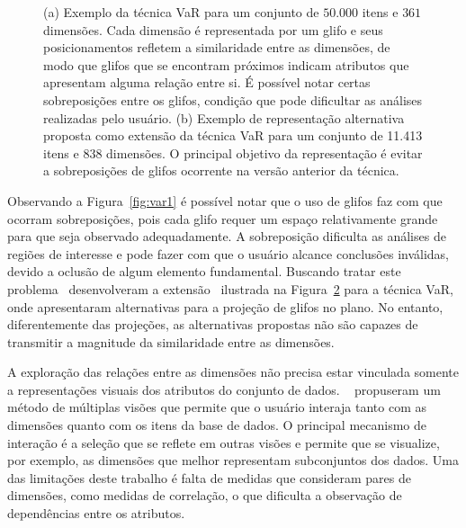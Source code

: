 \begin{figure}[h!]
\begin{subfigure}[b]{0.475\textwidth}
    \caption{}
    \label{fig:var2}
  \end{subfigure}
  \caption[VaR: Value and Relation]{(a) Exemplo da técnica VaR para um conjunto de $50.000$ itens e $361$ dimensões. Cada dimensão é representada por um glifo e seus posicionamentos refletem a similaridade entre as dimensões, de modo que glifos que se encontram próximos indicam atributos que apresentam alguma relação entre si. É possível notar certas sobreposições entre os glifos, condição que pode dificultar as análises realizadas pelo usuário. (b) Exemplo de representação alternativa proposta como extensão da técnica VaR para um conjunto de 11.413 itens e 838 dimensões. O principal objetivo da representação é evitar a sobreposições de glifos ocorrente na versão anterior da técnica.}
\end{figure}

Observando a Figura~\ref{fig:var1} é possível notar que o uso de glifos faz com que ocorram sobreposições, pois cada glifo requer um espaço relativamente grande para que seja observado adequadamente. A sobreposição dificulta as análises de regiões de interesse e pode fazer com que o usuário alcance conclusões inválidas, devido a oclusão de algum elemento fundamental. Buscando tratar este problema~\citeauthor{Yang2007} desenvolveram a extensão~\cite{Yang2007} ilustrada na Figura~\ref{fig:var2} para a técnica VaR, onde apresentaram alternativas para a projeção de glifos no plano. No entanto, diferentemente das projeções, as alternativas propostas não são capazes de transmitir a magnitude da similaridade entre as dimensões.




A exploração das relações entre as dimensões não precisa estar vinculada somente a representações visuais dos atributos do conjunto de dados. \citeauthor{Turkay2011}~\cite{Turkay2011} propuseram um método de múltiplas visões que permite que o usuário interaja tanto com as dimensões quanto com os itens da base de dados. O principal mecanismo de interação é a seleção que se reflete em outras visões e permite que se visualize, por exemplo, as dimensões que melhor representam subconjuntos dos dados. Uma das limitações deste trabalho é falta de medidas que consideram pares de dimensões, como medidas de correlação, o que dificulta a observação de dependências entre os atributos.   

\clearpage

